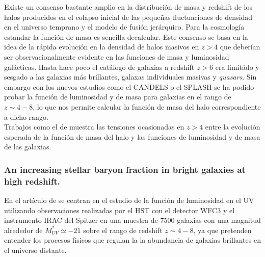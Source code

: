 \documentclass{article}
\begin{document}
Existe un consenso bastante amplio en la distribución de masa y redshift de los halos producidos en el colapso inicial de las pequeñas fluctuaciones de densidad en el universo temprano y el modelo de fusión jerárquico. Para la cosmología estandar la función de masa es sencilla decalcular. Este consenso se basa en la idea de la rápida evolución en la densidad de halos masivos en $z>4$ que deberían ser observacionalmente evidente en las funciones de masa y luminosidad galácticas. Hasta hace poco el catálogo de galaxias a redshift $z>6$ era limitádo y sesgado a las galaxias más brillantes, galaxas individuales masivas y \textit{quasars}. Sin embargo con los nuevos estudios como el CANDELS o el SPLASH se ha podido probar la función de luminosidad y de masa para galaxias en el rango de $z\sim 4-8$, lo que nos permite calcular la función de masa del halo correspondiente a dicho rango.\\

Trabajos como el de \cite{finkelstein2015increasing} muestra las tensiones ocasionadas en $z>4$ entre la evolución esperada de la función de masa del halo y las funciones de luminosidad y de masa de las galaxias. \\

\subsubsection*{An increasing stellar baryon fraction in bright galaxies at high redshift.}
En el artículo de \cite{finkelstein2015increasing} se centran en el estudio de la función de luminosidad en el UV utilizando observaciones realizadas por el HST con el detector WFC3 y el instrumento IRAC del Spitzer en una muestra de 7500 galaxias con una magnitud alrededor de $M_{UV}^*\simeq -21$ sobre el rango de redshift $z\sim 4-8$, ya que pretenden entender los procesos físicos que regulan la la abundancia de galaxias brillantes en el universo distante. \\
\end{document}
